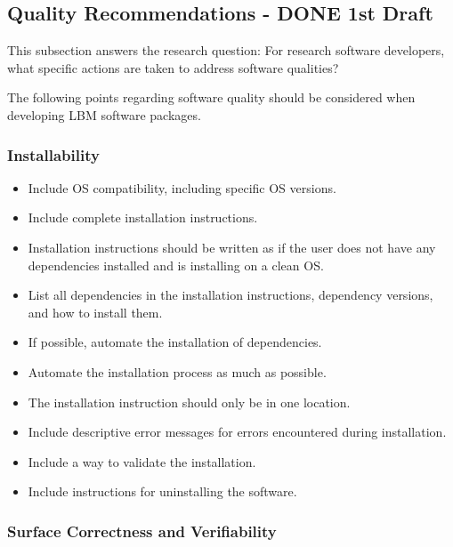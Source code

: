 \documentclass[12pt, notitlepage]{article}
\begin{document}
\subsection{Quality Recommendations - DONE 1st Draft}\label{qualityrecommentations}

This subsection answers the research question: For research software developers, what specific actions are taken to address software qualities?

The following points regarding software quality should be considered when developing LBM software packages.

\subsubsection{Installability}

\begin{itemize}
	\item Include OS compatibility, including specific OS versions.
	\item Include complete installation instructions.
	\item Installation instructions should be written as if the user does not have any dependencies installed and is installing on a clean OS.
	\item List all dependencies in the installation instructions, dependency versions, and how to install them.
	\item If possible, automate the installation of dependencies.
	\item Automate the installation process as much as possible.
	\item The installation instruction should only be in one location.
	\item Include descriptive error messages for errors encountered during installation.
	\item Include a way to validate the installation.
	\item Include instructions for uninstalling the software.
\end{itemize}

\subsubsection{Surface Correctness and Verifiability}
\end{document}
